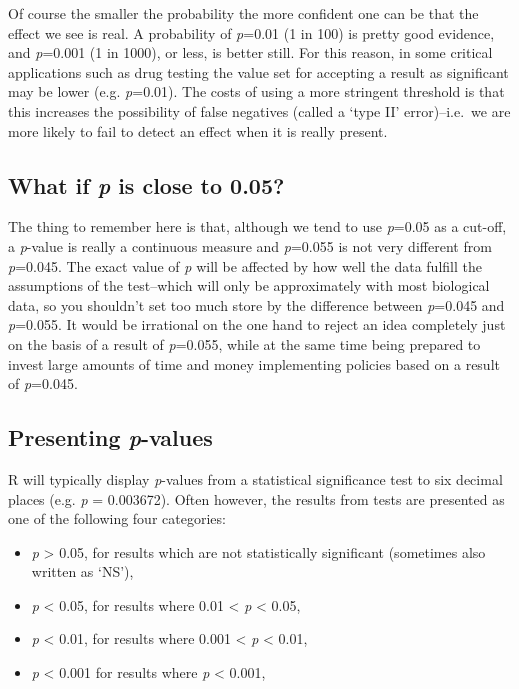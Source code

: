 \documentclass[]{book}
\begin{document}
Of course the smaller the probability the more confident one can be that
the effect we see is real. A probability of \emph{p}=0.01 (1 in 100) is
pretty good evidence, and \emph{p}=0.001 (1 in 1000), or less, is better
still. For this reason, in some critical applications such as drug
testing the value set for accepting a result as significant may be lower
(e.g. \emph{p}=0.01). The costs of using a more stringent threshold is
that this increases the possibility of false negatives (called a `type
II' error)--i.e.~we are more likely to fail to detect an effect when it
is really present.

\subsection{\texorpdfstring{What if \emph{p} is close to
0.05?}{What if p is close to 0.05?}}\label{what-if-p-is-close-to-0.05}

The thing to remember here is that, although we tend to use
\emph{p}=0.05 as a cut-off, a \emph{p}-value is really a continuous
measure and \emph{p}=0.055 is not very different from \emph{p}=0.045.
The exact value of \emph{p} will be affected by how well the data
fulfill the assumptions of the test--which will only be approximately
with most biological data, so you shouldn't set too much store by the
difference between \emph{p}=0.045 and \emph{p}=0.055. It would be
irrational on the one hand to reject an idea completely just on the
basis of a result of \emph{p}=0.055, while at the same time being
prepared to invest large amounts of time and money implementing policies
based on a result of \emph{p}=0.045.

\subsection{\texorpdfstring{Presenting
\emph{p}-values}{Presenting p-values}}\label{presenting-p-values}

R will typically display \emph{p}-values from a statistical significance
test to six decimal places (e.g. \emph{p} = 0.003672). Often however,
the results from tests are presented as one of the following four
categories:

\begin{itemize}
\item
  \emph{p} \textgreater{} 0.05, for results which are not statistically
  significant (sometimes also written as `NS'),
\item
  \emph{p} \textless{} 0.05, for results where 0.01 \textless{} \emph{p}
  \textless{} 0.05,
\item
  \emph{p} \textless{} 0.01, for results where 0.001 \textless{}
  \emph{p} \textless{} 0.01,
\item
  \emph{p} \textless{} 0.001 for results where \emph{p} \textless{}
  0.001,
\end{itemize}
\end{document}
